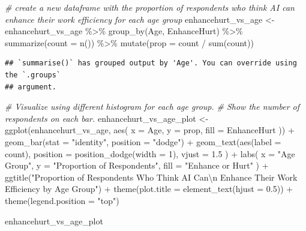 \documentclass[
]{article}
\newenvironment{Shaded}{\begin{snugshade}}{\end{snugshade}}
\newcommand{\AttributeTok}[1]{\textcolor[rgb]{0.77,0.63,0.00}{#1}}
\newcommand{\CommentTok}[1]{\textcolor[rgb]{0.56,0.35,0.01}{\textit{#1}}}
\newcommand{\DecValTok}[1]{\textcolor[rgb]{0.00,0.00,0.81}{#1}}
\newcommand{\FloatTok}[1]{\textcolor[rgb]{0.00,0.00,0.81}{#1}}
\newcommand{\FunctionTok}[1]{\textcolor[rgb]{0.00,0.00,0.00}{#1}}
\newcommand{\NormalTok}[1]{#1}
\newcommand{\OtherTok}[1]{\textcolor[rgb]{0.56,0.35,0.01}{#1}}
\newcommand{\SpecialCharTok}[1]{\textcolor[rgb]{0.00,0.00,0.00}{#1}}
\newcommand{\StringTok}[1]{\textcolor[rgb]{0.31,0.60,0.02}{#1}}
\begin{document}
\begin{Shaded}
\begin{Highlighting}[]
\CommentTok{\# create a new dataframe with the proportion of respondents who think AI can enhance their work efficiency for each age group}
\NormalTok{enhancehurt\_vs\_age }\OtherTok{\textless{}{-}}\NormalTok{ enhancehurt\_vs\_age }\SpecialCharTok{\%\textgreater{}\%}
  \FunctionTok{group\_by}\NormalTok{(Age, EnhanceHurt) }\SpecialCharTok{\%\textgreater{}\%}
  \FunctionTok{summarize}\NormalTok{(}\AttributeTok{count =} \FunctionTok{n}\NormalTok{()) }\SpecialCharTok{\%\textgreater{}\%}
  \FunctionTok{mutate}\NormalTok{(}\AttributeTok{prop =}\NormalTok{ count }\SpecialCharTok{/} \FunctionTok{sum}\NormalTok{(count))}
\end{Highlighting}
\end{Shaded}

\begin{verbatim}
## `summarise()` has grouped output by 'Age'. You can override using the `.groups`
## argument.
\end{verbatim}

\begin{Shaded}
\begin{Highlighting}[]
\CommentTok{\# Visualize using different histogram for each age group.}
\CommentTok{\# Show the number of respondents on each bar.}
\NormalTok{enhancehurt\_vs\_age\_plot }\OtherTok{\textless{}{-}} \FunctionTok{ggplot}\NormalTok{(enhancehurt\_vs\_age, }\FunctionTok{aes}\NormalTok{(}
  \AttributeTok{x =}\NormalTok{ Age, }\AttributeTok{y =}\NormalTok{ prop,}
  \AttributeTok{fill =}\NormalTok{ EnhanceHurt}
\NormalTok{)) }\SpecialCharTok{+}
  \FunctionTok{geom\_bar}\NormalTok{(}\AttributeTok{stat =} \StringTok{"identity"}\NormalTok{, }\AttributeTok{position =} \StringTok{"dodge"}\NormalTok{) }\SpecialCharTok{+}
  \FunctionTok{geom\_text}\NormalTok{(}\FunctionTok{aes}\NormalTok{(}\AttributeTok{label =}\NormalTok{ count),}
    \AttributeTok{position =} \FunctionTok{position\_dodge}\NormalTok{(}\AttributeTok{width =} \DecValTok{1}\NormalTok{),}
    \AttributeTok{vjust =} \FloatTok{1.5}
\NormalTok{  ) }\SpecialCharTok{+}
  \FunctionTok{labs}\NormalTok{(}
    \AttributeTok{x =} \StringTok{"Age Group"}\NormalTok{, }\AttributeTok{y =} \StringTok{"Proportion of Respondents"}\NormalTok{,}
    \AttributeTok{fill =} \StringTok{"Enhance or Hurt"}
\NormalTok{  ) }\SpecialCharTok{+}
  \FunctionTok{ggtitle}\NormalTok{(}\StringTok{"Proportion of Respondents Who Think AI Can}\SpecialCharTok{\textbackslash{}n}
\StringTok{  Enhance Their Work Efficiency by Age Group"}\NormalTok{) }\SpecialCharTok{+}
  \FunctionTok{theme}\NormalTok{(}\AttributeTok{plot.title =} \FunctionTok{element\_text}\NormalTok{(}\AttributeTok{hjust =} \FloatTok{0.5}\NormalTok{)) }\SpecialCharTok{+}
  \FunctionTok{theme}\NormalTok{(}\AttributeTok{legend.position =} \StringTok{"top"}\NormalTok{)}

\NormalTok{enhancehurt\_vs\_age\_plot}
\end{Highlighting}
\end{Shaded}
\end{document}

